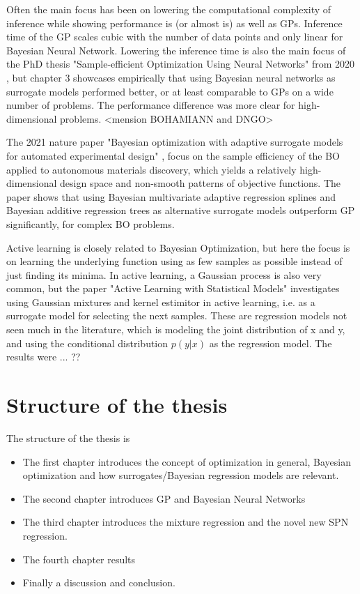 Often the main focus has been on lowering the computational complexity of inference while
showing performance is (or almost is) as well as GPs. Inference time of the GP scales cubic with the
number of data points and only linear for Bayesian Neural Network. Lowering the inference time is also the
main focus of the PhD thesis "Sample-efficient Optimization Using Neural Networks" from 2020
\cite{PhDthesis}, but chapter 3 showcases empirically that using Bayesian neural networks as
surrogate models performed better, or at least comparable to GPs on a wide number of
problems. The performance difference was more clear for high-dimensional problems. 
<mension BOHAMIANN and DNGO>

The 2021 nature paper "Bayesian optimization with adaptive surrogate models for automated experimental design"
\cite{Nature_BO_paper}, focus on the sample efficiency of the BO applied to autonomous materials discovery, 
which yields a relatively high-dimensional design space and non-smooth patterns of objective functions.  
The paper shows that using Bayesian multivariate adaptive regression splines
and Bayesian additive regression trees as alternative surrogate models outperform GP significantly, 
for complex BO problems. 

Active learning is closely related to Bayesian Optimization, but here the focus is on learning the underlying function
using as few samples as possible instead of just finding its minima. 
In active learning, a Gaussian process is also very common, but the paper "Active Learning with Statistical Models" \cite{ALStatisticalModels}
investigates using Gaussian mixtures and kernel estimitor in active learning, i.e. as a surrogate model for selecting
the next samples. These are regression models not seen much in the literature, which
is modeling the joint distribution of x and y, and using the conditional distribution $p(y|x)$
as the regression model. The results were ... ??

\section{Structure of the thesis}
The structure of the thesis is
\begin{itemize}
    \item The first chapter introduces the concept of optimization in general, Bayesian optimization 
    and how surrogates/Bayesian regression models are relevant.
    \item The second chapter introduces GP and Bayesian Neural Networks
    \item The third chapter introduces the mixture regression and the novel new SPN regression.
    \item The fourth chapter results
    \item Finally a discussion and conclusion.
\end{itemize}




